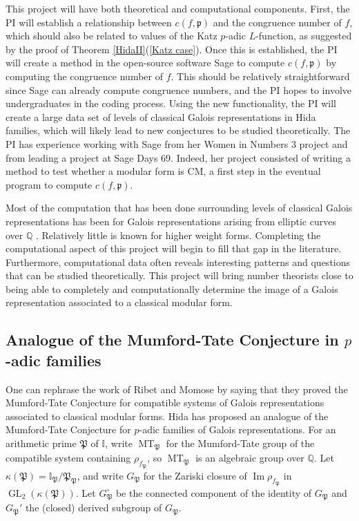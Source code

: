 \documentclass[11pt]{amsart}
\theoremstyle{definition}
\theoremstyle{remark}
\DeclareMathOperator{\MT}{MT}
\def\I{\mathbb{I}}
\def\p{\mathfrak{p}}
\def\Pp{\mathfrak{P}}
\def\Q{\mathbb{Q}}
\DeclareMathOperator{\GL}{GL}
\DeclareMathOperator{\im}{Im}
\begin{document}
This project will have both theoretical and computational components.  First, the PI will establish a relationship between $c(f, \p)$ and the congruence number of $f$, which should also be related to values of the Katz $p$-adic $L$-function, as suggested by the proof of Theorem \ref{HidaII}(\ref{Katz case}).  Once this is established, the PI will create a method in the open-source software Sage \cite{SAGE} to compute $c(f, \p)$ by computing the congruence number of $f$.  This should be relatively straightforward since Sage can already compute congruence numbers, and the PI hopes to involve undergraduates in the coding process.  Using the new functionality, the PI will create a large  data set of levels of classical Galois representations in Hida families, which will likely lead to new conjectures to be studied theoretically.  The PI has experience working with Sage from her Women in Numbers 3 project \cite{BCLMN15} and from leading a project at Sage Days 69.  Indeed, her project consisted of writing a method to test whether a modular form is CM, a first step in the eventual program to compute $c(f, \p)$.

Most of the computation that has been done surrounding levels of classical Galois representations has been for Galois representations arising from elliptic curves over $\Q$ \cite{RouseZureickBrown15, Sutherland15, Zywina15b}.  Relatively little is known for higher weight forms.  Completing the computational aspect of this project will begin to fill that gap in the literature.  Furthermore, computational data often reveals interesting patterns and questions that can be studied theoretically.  This project will bring number theorists close to being able to completely and computationally determine the image of a Galois representation associated to a classical modular form.

\subsection*{Analogue of the Mumford-Tate Conjecture in $p$-adic families}
One can rephrase the work of Ribet and Momose by saying that they proved the Mumford-Tate Conjecture for compatible systems of Galois representations associated to classical modular forms.  Hida has proposed an analogue of the Mumford-Tate Conjecture for $p$-adic families of Galois representations.  For an arithmetic prime $\Pp$ of $\I$, write $\MT_\Pp$ for the Mumford-Tate group of the compatible system containing $\rho_{f_\Pp}$, so $\MT_\Pp$ is an algebraic group over $\Q$.  Let $\kappa(\Pp) = \I_\Pp/\Pp_\Pp$, and write $G_\Pp$ for the Zariski closure of $\im \rho_{f_\Pp}$ in $\GL_2(\kappa(\Pp))$.  Let $G_\Pp^\circ$ be the connected component of the identity of $G_\Pp$ and $G_\Pp'$ the (closed) derived subgroup of $G_\Pp$.
\end{document}
